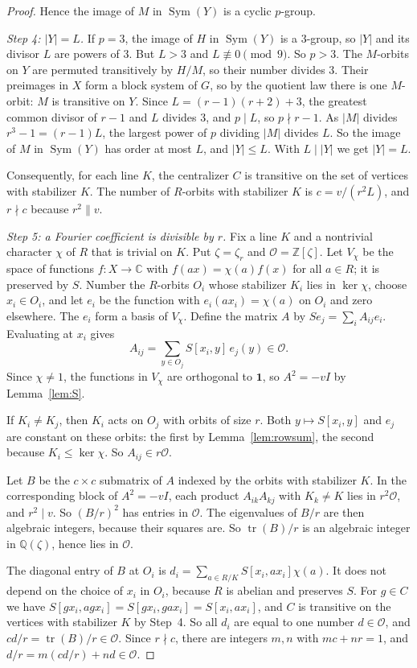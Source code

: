 \documentclass[11pt]{amsart}
\theoremstyle{definition}
\theoremstyle{remark}
\newcommand{\Q}{\mathbb{Q}}
\newcommand{\Z}{\mathbb{Z}}
\newcommand{\C}{\mathbb{C}}
\newcommand{\cO}{\mathcal{O}}
\newcommand{\one}{\mathbf{1}}
\newcommand{\Sym}{\operatorname{Sym}}
\newcommand{\tr}{\operatorname{tr}}
\begin{document}
\begin{proof}
Hence the image of $M$ in $\Sym(Y)$ is a cyclic $p$-group.

\emph{Step 4: $|Y|=L$.} If $p=3$, the image of $H$ in $\Sym(Y)$ is a $3$-group, so $|Y|$ and its divisor $L$ are powers of $3$. But $L>3$ and $L\not\equiv0\pmod9$. So $p>3$. The $M$-orbits on $Y$ are permuted transitively by $H/M$, so their number divides $3$. Their preimages in $X$ form a block system of $G$, so by the quotient law there is one $M$-orbit: $M$ is transitive on $Y$. Since $L=(r-1)(r+2)+3$, the greatest common divisor of $r-1$ and $L$ divides $3$, and $p\mid L$, so $p\nmid r-1$. As $|M|$ divides $r^3-1=(r-1)L$, the largest power of $p$ dividing $|M|$ divides $L$. So the image of $M$ in $\Sym(Y)$ has order at most $L$, and $|Y|\le L$. With $L\mid|Y|$ we get $|Y|=L$.

Consequently, for each line $K$, the centralizer $C$ is transitive on the set of vertices with stabilizer $K$. The number of $R$-orbits with stabilizer $K$ is $c=v/(r^2L)$, and $r\nmid c$ because $r^2\parallel v$.

\emph{Step 5: a Fourier coefficient is divisible by $r$.} Fix a line $K$ and a nontrivial character $\chi$ of $R$ that is trivial on $K$. Put $\zeta=\zeta_r$ and $\cO=\Z[\zeta]$. Let $V_\chi$ be the space of functions $f\colon X\to\C$ with $f(ax)=\chi(a)f(x)$ for all $a\in R$; it is preserved by $S$. Number the $R$-orbits $O_i$ whose stabilizer $K_i$ lies in $\ker\chi$, choose $x_i\in O_i$, and let $e_i$ be the function with $e_i(ax_i)=\chi(a)$ on $O_i$ and zero elsewhere. The $e_i$ form a basis of $V_\chi$. Define the matrix $A$ by $Se_j=\sum_iA_{ij}e_i$. Evaluating at $x_i$ gives
\[
A_{ij}=\sum_{y\in O_j}S[x_i,y]\,e_j(y)\in\cO .
\]
Since $\chi\ne1$, the functions in $V_\chi$ are orthogonal to $\one$, so $A^2=-vI$ by Lemma~\ref{lem:S}.

If $K_i\ne K_j$, then $K_i$ acts on $O_j$ with orbits of size $r$. Both $y\mapsto S[x_i,y]$ and $e_j$ are constant on these orbits: the first by Lemma~\ref{lem:rowsum}, the second because $K_i\le\ker\chi$. So $A_{ij}\in r\cO$.

Let $B$ be the $c\times c$ submatrix of $A$ indexed by the orbits with stabilizer $K$. In the corresponding block of $A^2=-vI$, each product $A_{ik}A_{kj}$ with $K_k\ne K$ lies in $r^2\cO$, and $r^2\mid v$. So $(B/r)^2$ has entries in $\cO$. The eigenvalues of $B/r$ are then algebraic integers, because their squares are. So $\tr(B)/r$ is an algebraic integer in $\Q(\zeta)$, hence lies in $\cO$.

The diagonal entry of $B$ at $O_i$ is $d_i=\sum_{a\in R/K}S[x_i,ax_i]\chi(a)$. It does not depend on the choice of $x_i$ in $O_i$, because $R$ is abelian and preserves $S$. For $g\in C$ we have $S[gx_i,agx_i]=S[gx_i,gax_i]=S[x_i,ax_i]$, and $C$ is transitive on the vertices with stabilizer $K$ by Step~4. So all $d_i$ are equal to one number $d\in\cO$, and $cd/r=\tr(B)/r\in\cO$. Since $r\nmid c$, there are integers $m,n$ with $mc+nr=1$, and $d/r=m(cd/r)+nd\in\cO$.


\end{proof}
\end{document}
